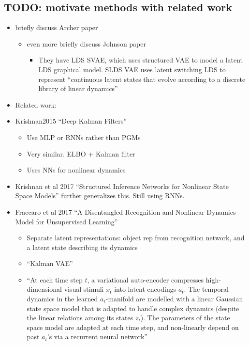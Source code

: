 \subsection*{TODO: motivate methods with related work}
\begin{itemize}
    \item briefly discuss Archer paper \cite{Archer2016}
    \begin{itemize}
        \item even more briefly discuss Johnson paper \cite{Johnson2016}
        \begin{itemize}
            \item They have LDS SVAE, which uses structured VAE to model a latent LDS graphical model. SLDS VAE uses latent switching LDS to represent ``continuous latent states that evolve according to a discrete library of linear dynamics''
        \end{itemize}
    \end{itemize}
    \item Related work: \cite{Gregor2015a,Krishnan2015,Watter2015,Karl2016,Fraccaro2016,Fraccaro2017a,Krishnan2017}
    \item Krishnan2015 ``Deep Kalman Filters''
    \begin{itemize}
        \item Use MLP or RNNs rather than PGMs
        \item Very similar. ELBO + Kalman filter
        \item Uses NNs for nonlinear dynamics
    \end{itemize}
    \item Krishnan et al 2017 ``Structured Inference Networks for Nonlinear State Space Models'' further generalizes this. Still using RNNs.
    \item Fraccaro et al 2017 ``A Disentangled Recognition and Nonlinear Dynamics Model for Unsupervised Learning''
    \begin{itemize}
        \item Separate latent representations: object rep from recognition network, and a latent state describing its dynamics
        \item ``Kalman VAE''
        \item ``At each time step $t$, a variational auto-encoder compresses high-dimensional visual stimuli $x_t$ into latent encodings $a_t$. The temporal dynamics in the learned $a_t$-manifold are modelled with a linear Gaussian state space model that is adapted to handle complex dynamics (despite the linear relations among its states $z_t$). The parameters of the state space model are adapted at each time step, and non-linearly depend on past $a_t$’s via a recurrent neural network''

\end{itemize}
\end{itemize}
